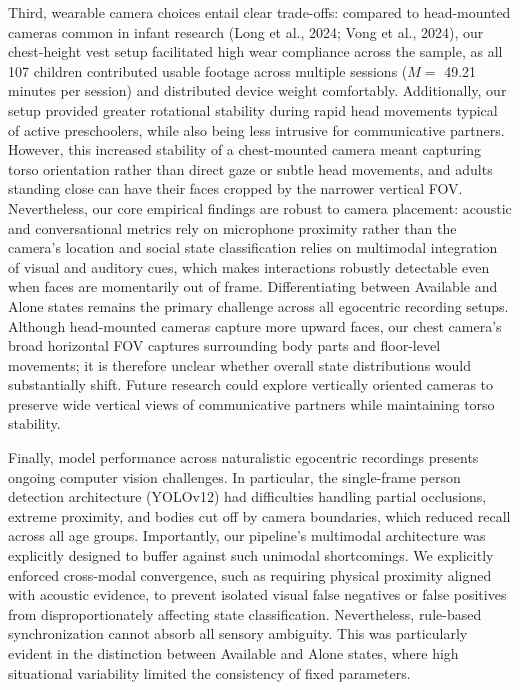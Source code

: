 \documentclass[
  english,
  12pt,
  man,floatsintext]{apa6}
\begin{document}
Third, wearable camera choices entail clear trade-offs: compared to head-mounted cameras common in infant research (Long et al., 2024; Vong et al., 2024), our chest-height vest setup facilitated high wear compliance across the sample, as all 107 children contributed usable footage across multiple sessions (\(M=\) 49.21 minutes per session) and distributed device weight comfortably. Additionally, our setup provided greater rotational stability during rapid head movements typical of active preschoolers, while also being less intrusive for communicative partners. However, this increased stability of a chest-mounted camera meant capturing torso orientation rather than direct gaze or subtle head movements, and adults standing close can have their faces cropped by the narrower vertical FOV. Nevertheless, our core empirical findings are robust to camera placement: acoustic and conversational metrics rely on microphone proximity rather than the camera's location and social state classification relies on multimodal integration of visual and auditory cues, which makes interactions robustly detectable even when faces are momentarily out of frame. Differentiating between Available and Alone states remains the primary challenge across all egocentric recording setups. Although head-mounted cameras capture more upward faces, our chest camera's broad horizontal FOV captures surrounding body parts and floor-level movements; it is therefore unclear whether overall state distributions would substantially shift. Future research could explore vertically oriented cameras to preserve wide vertical views of communicative partners while maintaining torso stability.

Finally, model performance across naturalistic egocentric recordings presents ongoing computer vision challenges. In particular, the single-frame person detection architecture (YOLOv12) had difficulties handling partial occlusions, extreme proximity, and bodies cut off by camera boundaries, which reduced recall across all age groups. Importantly, our pipeline's multimodal architecture was explicitly designed to buffer against such unimodal shortcomings. We explicitly enforced cross-modal convergence, such as requiring physical proximity aligned with acoustic evidence, to prevent isolated visual false negatives or false positives from disproportionately affecting state classification. Nevertheless, rule-based synchronization cannot absorb all sensory ambiguity. This was particularly evident in the distinction between Available and Alone states, where high situational variability limited the consistency of fixed parameters.
\end{document}
